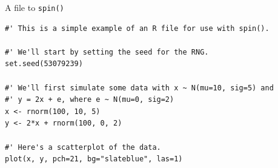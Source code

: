 \documentclass[12pt,t]{beamer}
\begin{document}
\begin{frame}[fragile]{A file to {\tt spin()}}

\vspace{24pt}

\begin{lstlisting}
#' This is a simple example of an R file for use with spin().

#' We'll start by setting the seed for the RNG.
set.seed(53079239)

#' We'll first simulate some data with x ~ N(mu=10, sig=5) and
#' y = 2x + e, where e ~ N(mu=0, sig=2)
x <- rnorm(100, 10, 5)
y <- 2*x + rnorm(100, 0, 2)

#' Here's a scatterplot of the data.
plot(x, y, pch=21, bg="slateblue", las=1)
\end{lstlisting}

\end{frame}
\end{document}
